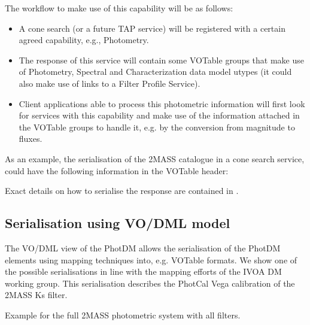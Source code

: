 \documentclass[11pt,a4paper]{ivoa}
\begin{document}
\begin{appendices}
The workflow to make use of this capability will be as follows:
\par

\begin{itemize}
	\item{A cone search (or a future TAP service) will be registered with a 
	certain agreed capability, e.g., Photometry.\par}

	\item{The response of this service will contain some VOTable groups that 
	make use of Photometry, Spectral and Characterization data model utypes 
	(it could also make use of links to a Filter Profile Service).\par}

	\item{Client applications able to process this photometric information 
	will first look for services with this capability and make use of the 
	information attached in the VOTable groups to handle it, e.g. by the 
	conversion from magnitude to fluxes.}
\end{itemize}\par

As an example, the serialisation of the 2MASS catalogue in a cone search service, 
could have the following information in the VOTable header:
\par


Exact details on how to serialise the response are contained in \citep{derriere}.

\subsection{Serialisation using VO/DML model} \label{appendixmapping}
The VO/DML view of the PhotDM allows the serialisation of the PhotDM elements
using mapping techniques into, e.g. VOTable formats. We show one of the possible 
serialisations in line with the mapping efforts of the IVOA DM working group. 
This serialisation describes the PhotCal Vega calibration of the 2MASS Ks filter.
\par 



 Example for the full 2MASS photometric system with all filters.
 


\end{appendices}


\end{document}
